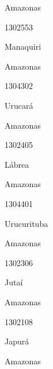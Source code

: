 \documentclass[
  letterpaper,
]{report}
\begin{document}
\n    

\n    

\n      

Amazonas

\n      

1302553

\n      

Manaquiri

\n    

\n    

\n      

Amazonas

\n      

1304302

\n      

Urucará

\n    

\n    

\n      

Amazonas

\n      

1302405

\n      

Lábrea

\n    

\n    

\n      

Amazonas

\n      

1304401

\n      

Urucurituba

\n    

\n    

\n      

Amazonas

\n      

1302306

\n      

Jutaí

\n    

\n    

\n      

Amazonas

\n      

1302108

\n      

Japurá

\n    

\n    

\n      

Amazonas

\n      
\end{document}
